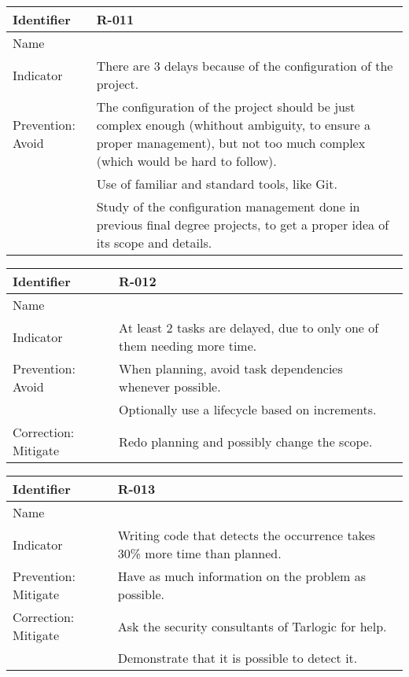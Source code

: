 \begin{table}[H]
	\begin{tabularx}{\textwidth}{|y|z|}
		\hline
		Identifier & \textbf{R-011} \\ \hline
		Name & \Ronce \\ \hline
		Indicator & There are 3 delays because of the configuration of the project.\\ \hline
		Prevention: Avoid
			& The configuration of the project should be just complex enough (whithout ambiguity, to ensure a proper management), but not too much complex (which would be hard to follow). \\
			& Use of familiar and standard tools, like Git.\\
			& Study of the configuration management done in previous final degree projects, to get a proper idea of its scope and details.\\ \hline
	\end{tabularx}
\end{table}

\begin{table}[H]
	\begin{tabularx}{\textwidth}{|y|z|}
		\hline
		Identifier & \textbf{R-012} \\ \hline
		Name & \Rdoce \\ \hline
		Indicator & At least 2 tasks are delayed, due to only one of them needing more time.\\ \hline
		Prevention: Avoid
			& When planning, avoid task dependencies whenever possible. \\
			& Optionally use a lifecycle based on increments.\\ \hline
		Correction: Mitigate & Redo planning and possibly change the scope. \\ \hline
	\end{tabularx}
\end{table}

\begin{table}[H]
	\begin{tabularx}{\textwidth}{|y|z|}
		\hline
		Identifier & \textbf{R-013} \\ \hline
		Name & \Rtrece \\ \hline
		Indicator & Writing code that detects the occurrence takes 30\% more time than planned.\\ \hline
		Prevention: Mitigate
			& Have as much information on the problem as possible. \\ \hline
		Correction: Mitigate
			& Ask the security consultants of Tarlogic for help. \\
			& Demonstrate that it is possible to detect it. \\ \hline
	\end{tabularx}
\end{table}

